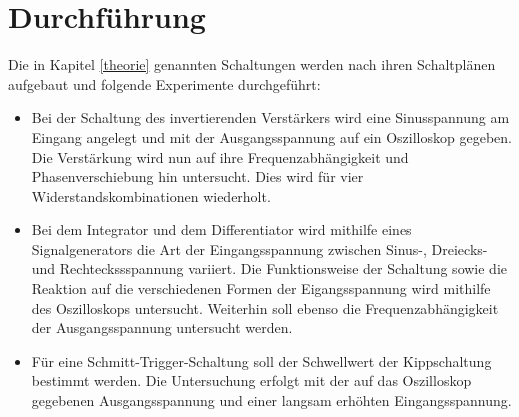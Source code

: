\section{Durchführung}
Die in Kapitel \ref{theorie} genannten Schaltungen werden nach ihren Schaltplänen aufgebaut und folgende Experimente durchgeführt:
\begin{itemize}
\item Bei der Schaltung des invertierenden Verstärkers wird eine Sinusspannung am Eingang angelegt und mit der Ausgangsspannung auf ein Oszilloskop gegeben. Die Verstärkung wird nun auf ihre Frequenzabhängigkeit und Phasenverschiebung hin untersucht. Dies wird für vier Widerstandskombinationen wiederholt.
\item Bei dem Integrator und dem Differentiator wird mithilfe eines Signalgenerators die Art der Eingangsspannung zwischen Sinus-, Dreiecks- und Rechteckssspannung variiert. Die Funktionsweise der Schaltung sowie die Reaktion auf die verschiedenen Formen der Eigangsspannung wird mithilfe des Oszilloskops untersucht. Weiterhin soll ebenso die Frequenzabhängigkeit der Ausgangsspannung untersucht werden.
\item Für eine Schmitt-Trigger-Schaltung soll der Schwellwert der Kippschaltung bestimmt werden. Die Untersuchung erfolgt mit der auf das Oszilloskop gegebenen Ausgangsspannung und einer langsam erhöhten Eingangsspannung.
\end{itemize}
